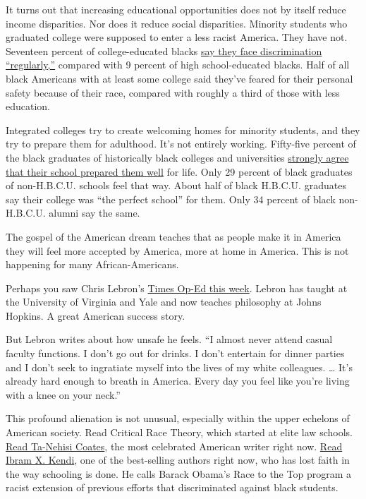 It turns out that increasing educational opportunities does not by
itself reduce income disparities. Nor does it reduce social disparities.
Minority students who graduated college were supposed to enter a less
racist America. They have not. Seventeen percent of college-educated
blacks
\href{https://www.pewresearch.org/fact-tank/2019/05/02/for-black-americans-experiences-of-racial-discrimination-vary-by-education-level-gender/}{say
they face discrimination ``regularly,''} compared with 9 percent of high
school-educated blacks. Half of all black Americans with at least some
college said they've feared for their personal safety because of their
race, compared with roughly a third of those with less education.

Integrated colleges try to create welcoming homes for minority students,
and they try to prepare them for adulthood. It's not entirely working.
Fifty-five percent of the black graduates of historically black colleges
and universities
\href{https://www.insidehighered.com/news/2015/10/28/survey-finds-big-differences-between-black-hbcu-graduates-those-who-attended-other\#:~:text=Black\%20graduates\%20of\%20historically\%20black,ongoing\%20Gallup\%2DPurdue\%20University\%20study.}{strongly
agree that their school prepared them well} for life. Only 29 percent of
black graduates of non-H.B.C.U. schools feel that way. About half of
black H.B.C.U. graduates say their college was ``the perfect school''
for them. Only 34 percent of black non-H.B.C.U. alumni say the same.

The gospel of the American dream teaches that as people make it in
America they will feel more accepted by America, more at home in
America. This is not happening for many African-Americans.

Perhaps you saw Chris Lebron's
\href{https://www.nytimes.com/2020/06/16/opinion/black-academia-racism.html}{Times
Op-Ed this week}. Lebron has taught at the University of Virginia and
Yale and now teaches philosophy at Johns Hopkins. A great American
success story.

But Lebron writes about how unsafe he feels. ``I almost never attend
casual faculty functions. I don't go out for drinks. I don't entertain
for dinner parties and I don't seek to ingratiate myself into the lives
of my white colleagues. \ldots{} It's already hard enough to breath in
America. Every day you feel like you're living with a knee on your
neck.''

This profound alienation is not unusual, especially within the upper
echelons of American society. Read Critical Race Theory, which started
at elite law schools. \href{https://ta-nehisicoates.com/books/}{Read
Ta-Nehisi Coates}, the most celebrated American writer right now.
\href{https://www.ibramxkendi.com/how-to-be-an-antiracist-1}{Read Ibram
X. Kendi}, one of the best-selling authors right now, who has lost faith
in the way schooling is done. He calls Barack Obama's Race to the Top
program a racist extension of previous efforts that discriminated
against black students.

